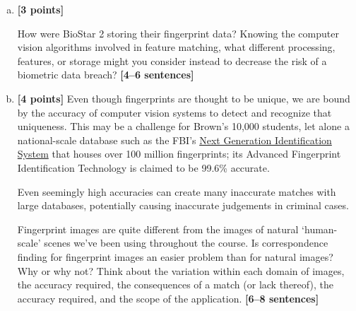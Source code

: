 \documentclass{csci1430}
\begin{document}
\begin{enumerate}[(a)]
    \item \textbf{[3 points]}
    \begin{tcolorbox}[colback=orange!5!white,colframe=orange!75!black]
    How were BioStar 2 storing their fingerprint data? Knowing the computer vision algorithms involved in feature matching, what different processing, features, or storage might you consider instead to decrease the risk of a biometric data breach? \textbf{[4--6 sentences]}
    \end{tcolorbox}


    \pagebreak
    \item 
    \textbf{[4 points]}
Even though fingerprints are thought to be unique, we are bound by the accuracy of computer vision systems to detect and recognize that uniqueness.
This may be a challenge for Brown's 10,000 students, let alone a national-scale database such as the FBI's \href{https://www.fbi.gov/services/cjis/fingerprints-and-other-biometrics/ngi}{Next Generation Identification System} that houses over 100 million fingerprints; its Advanced Fingerprint Identification Technology is claimed to be 99.6\% accurate.

Even seemingly high accuracies can create many inaccurate matches with large databases, potentially causing inaccurate judgements in criminal cases. 

    \begin{tcolorbox}[colback=orange!5!white,colframe=orange!75!black]
    Fingerprint images are quite different from the images of natural ‘human-scale’ scenes we've been using throughout the course. Is correspondence finding for fingerprint images an easier problem than for natural images? Why or why not? Think about the variation within each domain of images, the accuracy required, the consequences of a match (or lack thereof), the accuracy required, and the scope of the application. \textbf{[6--8 sentences]}


\end{tcolorbox}
\end{enumerate}
\end{document}
